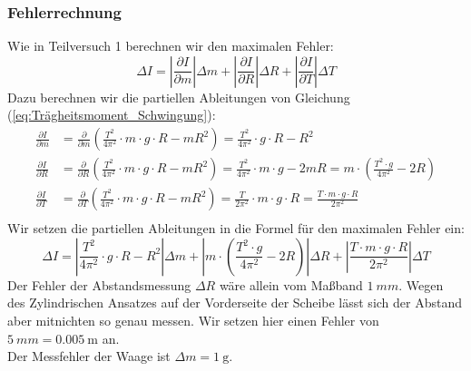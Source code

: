 \documentclass{article}
\begin{document}
	\subsubsection{Fehlerrechnung}
	Wie in Teilversuch 1 berechnen wir den maximalen Fehler:
	\begin{equation}
		\Delta I =
		\left| \frac{\partial I}{\partial m} \right| \Delta m +
		\left| \frac{\partial I}{\partial R} \right| \Delta R +
		\left| \frac{\partial I}{\partial T} \right| \Delta T
	\end{equation}
	Dazu berechnen wir die partiellen Ableitungen von Gleichung (\ref{eq:Trägheitsmoment_Schwingung}):
	\begin{equation}
		\begin{aligned}
			\frac{\partial I}{\partial m} & = \frac{\partial}{\partial m} \left( \frac{T^2}{4 \pi^2} \cdot m \cdot g \cdot R - m R^2 \right) = \frac{T^2}{4 \pi^2} \cdot g \cdot R - R^2                                                              \\
			\frac{\partial I}{\partial R} & = \frac{\partial}{\partial R} \left( \frac{T^2}{4 \pi^2} \cdot m \cdot g \cdot R - m R^2 \right) = \frac{T^2}{4 \pi^2} \cdot m \cdot g - 2 m R = m \cdot \left( \frac{T^2 \cdot g }{4 \pi^2} - 2R \right) \\
			\frac{\partial I}{\partial T} & = \frac{\partial}{\partial T} \left( \frac{T^2}{4 \pi^2} \cdot m \cdot g \cdot R - m R^2 \right) = \frac{T}{2 \pi^2} \cdot m \cdot g \cdot R  = \frac{T \cdot m \cdot g \cdot R}{2 \pi^2 }                \\
		\end{aligned}
	\end{equation}
	Wir setzen die partiellen Ableitungen in die Formel für den maximalen Fehler ein:
	\begin{equation}\label{eq:Maximaler_Fehler_Schwingung}
		\Delta I =
		\left| \frac{T^2}{4 \pi^2} \cdot g \cdot R - R^2 \right| \Delta m +
		\left| m \cdot \left( \frac{T^2 \cdot g }{4 \pi^2} - 2R \right) \right| \Delta R +
		\left| \frac{T \cdot m \cdot g \cdot R}{2 \pi^2 } \right| \Delta T
	\end{equation}
	Der Fehler der Abstandsmessung \(\Delta R\) wäre allein vom Maßband \(\SI{1}{mm}\).
	Wegen des Zylindrischen Ansatzes auf der Vorderseite der Scheibe lässt sich der Abstand aber mitnichten so genau messen.
	Wir setzen hier einen Fehler von \(\SI{5}{mm} = \SI{0,005}{\metre} \) an. \\
	Der Messfehler der Waage ist \(\Delta m = \SI{1}{\gram}\). \\
\end{document}
